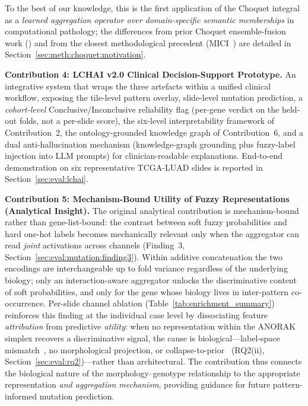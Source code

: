 To the best of our knowledge, this is the first application of the
Choquet integral as a \emph{learned aggregation operator over
domain-specific semantic memberships} in computational pathology;
the differences from prior Choquet ensemble-fusion work
(\cite{bhowal2021fuzzybach}) and from the closest methodological
precedent (MICI~\cite{mccurley2023mici}) are detailed in
Section~\ref{sec:meth:choquet:motivation}.

\textbf{Contribution 4: LCHAI v2.0 Clinical Decision-Support
Prototype.}
An integrative system that wraps the three artefacts within a
unified clinical workflow, exposing the tile-level pattern
overlay, slide-level mutation prediction, a
\emph{cohort-level} Conclusive/Inconclusive reliability flag
(per-gene verdict on the held-out folds, not a per-slide score),
the six-level interpretability framework of Contribution~2, the
ontology-grounded knowledge graph of Contribution~6, and a dual
anti-hallucination mechanism (knowledge-graph grounding plus
fuzzy-label injection into LLM prompts) for clinician-readable
explanations.
End-to-end demonstration on six representative TCGA-LUAD slides is
reported in Section~\ref{sec:eval:lchai}.

\textbf{Contribution 5: Mechanism-Bound Utility of Fuzzy
Representations (Analytical Insight).}
The original analytical contribution is mechanism-bound rather than
gene-list-bound: the contrast between soft fuzzy probabilities and
hard one-hot labels becomes mechanically relevant only when the
aggregator can read \emph{joint} activations across channels
(Finding~3, Section~\ref{sec:eval:mutation:finding3}).
Within additive concatenation the two encodings are interchangeable
up to fold variance regardless of the underlying biology; only an
interaction-aware aggregator unlocks the discriminative content of
soft probabilities, and only for the gene whose biology lives in
inter-pattern co-occurrence.
Per-slide channel ablation
(Table~\ref{tab:enrichment_summary}) reinforces this finding at the
individual case level by dissociating feature \emph{attribution}
from predictive \emph{utility}: when no representation within the
ANORAK simplex recovers a discriminative signal, the cause is
biological---label-space
mismatch~\cite{lipton2018labelshift}, no morphological projection,
or collapse-to-prior~\cite{bowman2016posteriorcollapse}
(RQ2(ii), Section~\ref{sec:eval:rq2})---rather than architectural.
The contribution thus connects the biological nature of the
morphology--genotype relationship to the appropriate representation
\emph{and aggregation mechanism}, providing guidance for future
pattern-informed mutation prediction.

